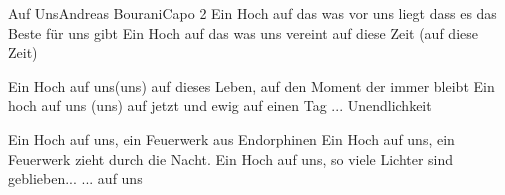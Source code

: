 \begin{song}{Auf Uns}{Andreas Bourani}{Capo 2}
Ein Hoch auf das was vor uns liegt dass es das Beste für uns gibt
Ein Hoch auf das was uns vereint auf diese Zeit (auf diese Zeit)

Ein Hoch auf uns(uns) auf dieses Leben,
auf den Moment der immer bleibt
Ein hoch auf uns (uns) auf jetzt und ewig
auf einen Tag ... Unendlichkeit

Ein Hoch auf uns, ein Feuerwerk aus Endorphinen
Ein Hoch auf uns, ein Feuerwerk zieht durch die Nacht.
Ein Hoch auf uns, so viele Lichter sind geblieben...
... auf uns
\end{song}
